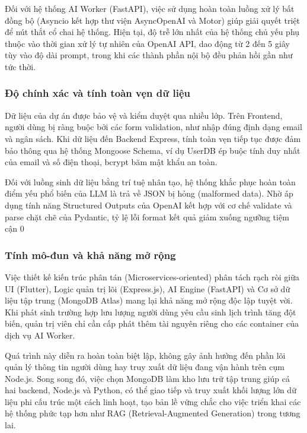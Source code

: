\quad Đối với hệ thống AI Worker (FastAPI), việc sử dụng hoàn toàn luồng xử lý bất đồng bộ (Asyncio kết hợp thư viện AsyncOpenAI và Motor) giúp giải quyết triệt để nút thắt cổ chai hệ thống. Hiện tại, độ trễ lớn nhất của hệ thống chủ yếu phụ thuộc vào thời gian xử lý tự nhiên của OpenAI API, dao động từ 2 đến 5 giây tùy vào độ dài prompt, trong khi các thành phần nội bộ đều phản hồi gần như tức thời.

\subsubsection{Độ chính xác và tính toàn vẹn dữ liệu}

\quad Dữ liệu của dự án được bảo vệ và kiểm duyệt qua nhiều lớp. Trên Frontend, người dùng bị ràng buộc bởi các form validation, như nhập đúng định dạng email và ngân sách. Khi dữ liệu đến Backend Express, tính toàn vẹn tiếp tục được đảm bảo thông qua hệ thống Mongoose Schema, ví dụ UserDB ép buộc tính duy nhất của email và số điện thoại, bcrypt băm mật khẩu an toàn.

\quad Đối với luồng sinh dữ liệu bằng trí tuệ nhân tạo, hệ thống khắc phục hoàn toàn điểm yếu phổ biến của LLM là trả về JSON bị hỏng (malformed data). Nhờ áp dụng tính năng Structured Outputs của OpenAI kết hợp với cơ chế validate và parse chặt chẽ của Pydantic, tỷ lệ lỗi format kết quả giảm xuống ngưỡng tiệm cận 0%

\subsubsection{Tính mô-đun và khả năng mở rộng}

\quad Việc thiết kế kiến trúc phân tán (Microservices-oriented) phân tách rạch ròi giữa UI (Flutter), Logic quản trị lõi (Express.js), AI Engine (FastAPI) và Cơ sở dữ liệu tập trung (MongoDB Atlas) mang lại khả năng mở rộng độc lập tuyệt vời. Khi phát sinh trường hợp lưu lượng người dùng yêu cầu sinh lịch trình tăng đột biến, quản trị viên chỉ cần cấp phát thêm tài nguyên riêng cho các container của dịch vụ AI Worker.

\quad Quá trình này diễn ra hoàn toàn biệt lập, không gây ảnh hưởng đến phần lõi quản lý thông tin người dùng hay truy xuất dữ liệu đang vận hành trên cụm Node.js. Song song đó, việc chọn MongoDB làm kho lưu trữ tập trung giúp cả hai backend, Node.js và Python, có thể giao tiếp và truy xuất khối lượng lớn dữ liệu phi cấu trúc một cách linh hoạt, tạo bản lề vững chắc cho việc triển khai các hệ thống phức tạp hơn như RAG (Retrieval-Augmented Generation) trong tương lai.
